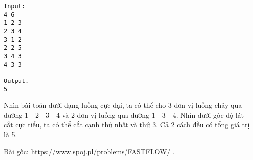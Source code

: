 \begin{verbatim}
Input:
4 6
1 2 3
2 3 4
3 1 2
2 2 5
3 4 3
4 3 3

Output:
5
\end{verbatim}

   Nhìn bài toán dưới dạng luồng cực đại, ta có thể cho 3 đơn vị luồng chảy qua đường 1 - 2 - 3 - 4 và 2 đơn vị luồng qua đường 1 - 3 - 4. Nhìn dưới góc độ lát cắt cực tiểu, ta có thể cắt cạnh thứ nhất và thứ 3. Cả 2 cách đều có tổng giá trị là 5.  

   Bài gốc:   \href{https://www.spoj.pl/problems/FASTFLOW/}{    https://www.spoj.pl/problems/FASTFLOW/   }   .